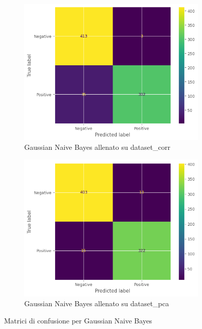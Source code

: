 \begin{figure}[!ht]
    \centering
    \begin{subfigure}{0.45\textwidth}
        \centering
        \includegraphics[width=\textwidth]{img/gnb/confusion_matrix_corr.png}
        \caption{Gaussian Naive Bayes allenato su dataset\_corr}
        \label{fig:matrice_di_confusione_per_GNB_corr}
    \end{subfigure}
    \hfill
    \begin{subfigure}{.45\textwidth}
        \centering
        \includegraphics[width=\textwidth]{img/gnb/confusion_matrix_pca.png}
        \caption{Gaussian Naive Bayes allenato su dataset\_pca}
        \label{fig:matrice_di_confusione_per_GNB_pca}
    \end{subfigure}
    \caption{Matrici di confusione per Gaussian Naive Bayes}
    \label{fig:matrice_di_confusione_per_GNB}
\end{figure}

